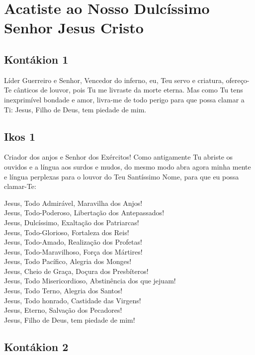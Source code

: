 \documentclass{subfiles}
\begin{document}
\chapter{Acatiste ao Nosso Dulcíssimo Senhor Jesus Cristo}

\section*{Kontákion 1}

Líder Guerreiro e Senhor, Vencedor do inferno, eu, Teu servo e
criatura, ofereço-Te cânticos de louvor, pois Tu me livraste da morte eterna.
Mas como Tu tens inexprimível bondade e amor, livra-me de todo perigo para
que possa clamar a Ti: Jesus, Filho de Deus, tem piedade de mim.

\section*{Ikos 1}

Criador dos anjos e Senhor dos Exércitos! Como antigamente Tu
abriste os ouvidos e a língua aos surdos e mudos, do mesmo modo abra agora
minha mente e língua perplexas para o louvor do Teu Santíssimo Nome, para
que eu possa clamar-Te:

Jesus, Todo Admirável, Maravilha dos Anjos! \\
Jesus, Todo-Poderoso, Libertação dos Antepassados! \\
Jesus, Dulcíssimo, Exaltação dos Patriarcas! \\
Jesus, Todo-Glorioso, Fortaleza dos Reis! \\
Jesus, Todo-Amado, Realização dos Profetas! \\
Jesus, Todo-Maravilhoso, Força dos Mártires! \\
Jesus, Todo Pacífico, Alegria dos Monges! \\
Jesus, Cheio de Graça, Doçura dos Presbíteros! \\
Jesus, Todo Misericordioso, Abstinência dos que jejuam! \\
Jesus, Todo Terno, Alegria dos Santos! \\
Jesus, Todo honrado, Castidade das Virgens! \\
Jesus, Eterno, Salvação dos Pecadores! \\
Jesus, Filho de Deus, tem piedade de mim!

\section*{Kontákion 2}
\end{document}
